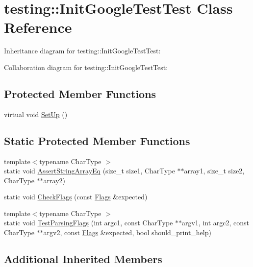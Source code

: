\hypertarget{classtesting_1_1_init_google_test_test}{}\section{testing\+:\+:Init\+Google\+Test\+Test Class Reference}
\label{classtesting_1_1_init_google_test_test}


Inheritance diagram for testing\+:\+:Init\+Google\+Test\+Test\+:


Collaboration diagram for testing\+:\+:Init\+Google\+Test\+Test\+:
\subsection*{Protected Member Functions}
\begin{DoxyCompactItemize}
\item 
virtual void \hyperlink{classtesting_1_1_init_google_test_test_a49de9e552ea788c4b79924ec4135ca7a}{Set\+Up} ()
\end{DoxyCompactItemize}
\subsection*{Static Protected Member Functions}
\begin{DoxyCompactItemize}
\item 
{\footnotesize template$<$typename Char\+Type $>$ }\\static void \hyperlink{classtesting_1_1_init_google_test_test_af32acd91b1185c6868072009dce55a7b}{Assert\+String\+Array\+Eq} (size\+\_\+t size1, Char\+Type $\ast$$\ast$array1, size\+\_\+t size2, Char\+Type $\ast$$\ast$array2)
\item 
static void \hyperlink{classtesting_1_1_init_google_test_test_aac37d5d592202bf6614b02fe0b4da9d2}{Check\+Flags} (const \hyperlink{structtesting_1_1_flags}{Flags} \&expected)
\item 
{\footnotesize template$<$typename Char\+Type $>$ }\\static void \hyperlink{classtesting_1_1_init_google_test_test_add290338cf429308d0ab275ae4c46e69}{Test\+Parsing\+Flags} (int argc1, const Char\+Type $\ast$$\ast$argv1, int argc2, const Char\+Type $\ast$$\ast$argv2, const \hyperlink{structtesting_1_1_flags}{Flags} \&expected, bool should\+\_\+print\+\_\+help)
\end{DoxyCompactItemize}
\subsection*{Additional Inherited Members}


